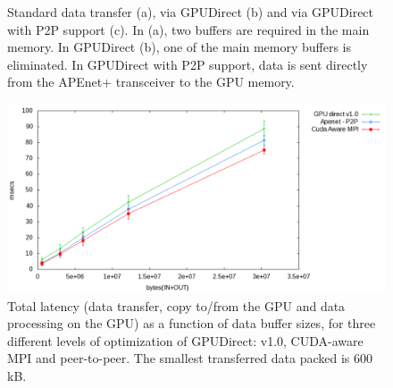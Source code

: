 \documentclass[letterpaper]{jpconf}
\begin{document}
\begin{figure}[!t]
\centering
{}
\hspace{1mm}
\caption{Standard data transfer (a), via GPUDirect (b) and via
  GPUDirect with P2P support (c). In (a), two buffers are required in
  the main memory. In GPUDirect (b), one of the main memory buffers is
  eliminated. In GPUDirect with P2P support, data is sent directly
  from the APEnet+ transceiver to the GPU memory.}
\end{figure}

\begin{figure}[tbp]
  \centering
  \includegraphics[width=0.9\linewidth]{figures/datatransfer.pdf}
  \caption{Total latency (data transfer, copy to/from the GPU and data processing on the GPU) as a function of data buffer sizes, for three different levels of optimization of GPUDirect: v1.0, CUDA-aware MPI and peer-to-peer. The smallest transferred data packed is 600 kB.}
  \label{fig:xferlatency}
\end{figure}
\end{document}
